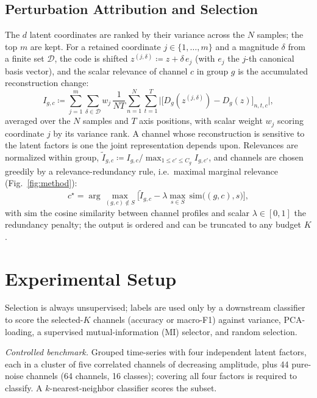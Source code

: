 \documentclass[conference]{IEEEtran}
\begin{document}
\subsection{Perturbation Attribution and Selection}
The $d$ latent coordinates are ranked by their variance across the $N$ samples; the
top $m$ are kept. For a retained coordinate $j\in\{1,\dots,m\}$ and a magnitude
$\delta$ from a finite set $\mathcal{D}$, the code is shifted
$z^{(j,\delta)}\coloneqq z+\delta\,e_j$ (with $e_j$ the $j$-th canonical basis vector), and
the scalar relevance of channel $c$ in group $g$ is the accumulated reconstruction
change:
\begin{equation}
I_{g,c} \coloneqq \sum_{j=1}^{m}\sum_{\delta\in\mathcal{D}} w_j\,
\frac{1}{NT}\sum_{n=1}^{N}\sum_{t=1}^{T}
\Big|\big[D_g(z^{(j,\delta)})-D_g(z)\big]_{n,t,c}\Big|,
\label{eq:relevance}
\end{equation}
averaged over the $N$ samples and $T$ axis positions, with scalar weight $w_j$
scoring coordinate $j$ by its variance rank. A channel whose reconstruction is
sensitive to the latent factors is one the joint representation depends upon.
Relevances are normalized within group,
$\tilde{I}_{g,c}\coloneqq I_{g,c}/\max_{1\le c'\le C_g} I_{g,c'}$, and channels are
chosen greedily by a relevance-redundancy rule, i.e.\ maximal marginal relevance
(Fig.~\ref{fig:method}):
\begin{equation}
c^\star = \arg\max_{(g,c)\notin S}
\Big[\tilde{I}_{g,c} - \lambda \max_{s\in S}\, \mathrm{sim}\big((g,c),s\big)\Big],
\end{equation}
with $\mathrm{sim}$ the cosine similarity between channel profiles and scalar
$\lambda\in[0,1]$ the redundancy penalty; the output is ordered and can be truncated
to any budget $K$.

\section{Experimental Setup}
Selection is always unsupervised; labels are used only by a downstream classifier
to score the selected-$K$ channels (accuracy or macro-F1) against variance,
PCA-loading, a supervised mutual-information (MI) selector, and random selection.

\emph{Controlled benchmark.} Grouped time-series with four independent latent
factors, each in a cluster of five correlated channels of decreasing amplitude,
plus 44 pure-noise channels (64 channels, 16 classes); covering all four factors is
required to classify. A $k$-nearest-neighbor classifier scores the subset.
\end{document}
